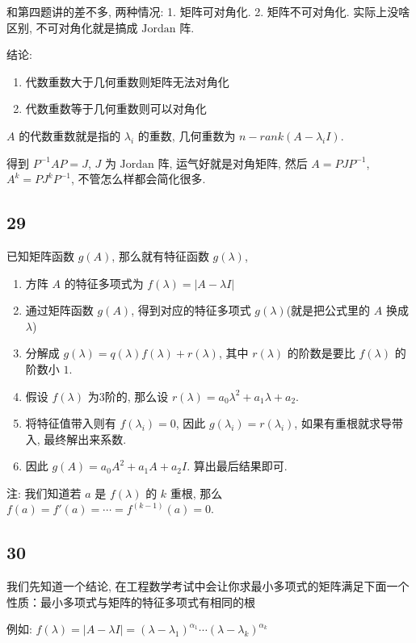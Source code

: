 \documentclass[a4paper, draft]{article}
\begin{document}
和第四题讲的差不多, 两种情况: 1. 矩阵可对角化. 2. 矩阵不可对角化. 
实际上没啥区别, 不可对角化就是搞成 $\text{Jordan}$ 阵.

结论: 
\begin{enumerate}
    \item 代数重数大于几何重数则矩阵无法对角化
    \item 代数重数等于几何重数则可以对角化
\end{enumerate}

$A$ 的代数重数就是指的 $\lambda_i$ 的重数, 几何重数为 $n-rank(A-\lambda_iI)$.

得到 $P^{-1}AP=J$, $J$ 为 $\text{Jordan}$ 阵, 运气好就是对角矩阵, 
然后 $A=PJP^{-1}$, $A^k=PJ^kP^{-1}$, 不管怎么样都会简化很多.

\subsection*{29}

已知矩阵函数 $g(A)$, 那么就有特征函数 $g(\lambda)$,

\begin{enumerate}
    \item 方阵 $A$ 的特征多项式为 $f(\lambda)=|A-\lambda I|$
    \item 通过矩阵函数 $g(A)$, 得到对应的特征多项式 $g(\lambda)$(就是把公式里的 $A$ 换成 $\lambda$)
    \item 分解成 $g(\lambda)=q(\lambda)f(\lambda)+r(\lambda)$, 其中 $r(\lambda)$ 的阶数是要比 $f(\lambda)$ 的阶数小 $1$.
    \item 假设 $f(\lambda)$ 为3阶的, 那么设 $r(\lambda)=a_0\lambda^2+a_1\lambda+a_2$.
    \item 将特征值带入则有 $f(\lambda_i)=0$, 因此 $g(\lambda_i)=r(\lambda_i)$, 如果有重根就求导带入, 最终解出来系数.
    \item 因此 $g(A)=a_0A^2+a_1A+a_2I$. 算出最后结果即可.
\end{enumerate}

注: 我们知道若 $a$ 是 $f(\lambda)$ 的 $k$ 重根, 那么 $f(a)=f'(a)=\cdots=f^{(k-1)}(a)=0$.

\subsection*{30}

我们先知道一个结论, 在工程数学考试中会让你求最小多项式的矩阵满足下面一个性质：最小多项式与矩阵的特征多项式有相同的根

例如: $f(\lambda)=|A-\lambda I|=(\lambda-\lambda_1)^{\alpha_1}\cdots(\lambda-\lambda_k)^{\alpha_k}$
\end{document}
